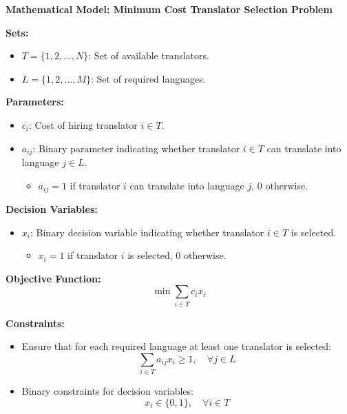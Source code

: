 \documentclass{article}
\begin{document}
\textbf{Mathematical Model: Minimum Cost Translator Selection Problem}

\textbf{Sets:}
\begin{itemize}
    \item $T = \{1, 2, \ldots, N\}$: Set of available translators.
    \item $L = \{1, 2, \ldots, M\}$: Set of required languages.
\end{itemize}

\textbf{Parameters:}
\begin{itemize}
    \item $c_i$: Cost of hiring translator $i \in T$.
    \item $a_{ij}$: Binary parameter indicating whether translator $i \in T$ can translate into language $j \in L$. 
    \begin{itemize}
        \item $a_{ij} = 1$ if translator $i$ can translate into language $j$, $0$ otherwise.
    \end{itemize}
\end{itemize}

\textbf{Decision Variables:}
\begin{itemize}
    \item $x_i$: Binary decision variable indicating whether translator $i \in T$ is selected. 
    \begin{itemize}
        \item $x_i = 1$ if translator $i$ is selected, $0$ otherwise.
    \end{itemize}
\end{itemize}

\textbf{Objective Function:}
\begin{equation}
\min \sum_{i \in T} c_i x_i
\end{equation}

\textbf{Constraints:}
\begin{itemize}
    \item Ensure that for each required language at least one translator is selected:
    \begin{equation}
    \sum_{i \in T} a_{ij} x_i \geq 1, \quad \forall j \in L
    \end{equation}
    \item Binary constraints for decision variables:
    \begin{equation}
    x_i \in \{0, 1\}, \quad \forall i \in T
    \end{equation}
\end{itemize}
\end{document}
